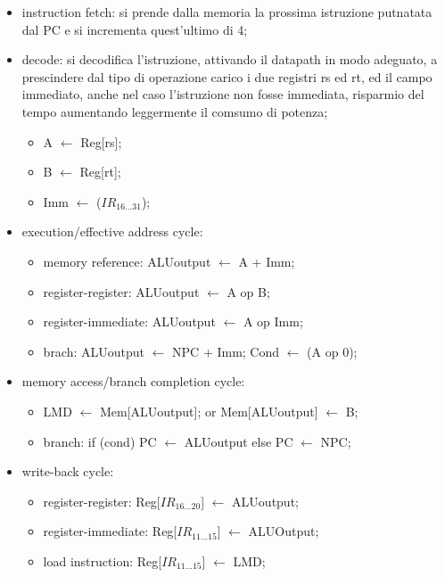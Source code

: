 \documentclass[12pt]{article}
\begin{document}
\begin{itemize}
    \item instruction fetch: si prende dalla memoria la prossima istruzione putnatata dal PC e si incrementa quest'ultimo di 4;
    \item decode: si decodifica l'istruzione, attivando il datapath in modo adeguato, a prescindere dal tipo di operazione carico i due registri rs ed rt, ed il campo immediato, anche nel caso l'istruzione non fosse immediata, risparmio del tempo aumentando leggermente il comsumo di potenza;
    \begin{itemize}
        \item A $\leftarrow$ Reg[rs];
        \item B $\leftarrow$ Reg[rt];
        \item Imm $\leftarrow$ ($IR_{16\dots 31}$);
    \end{itemize}
    \item execution/effective address cycle: 
        \begin{itemize}
            \item memory reference: ALUoutput $\leftarrow$ A + Imm;
            \item register-register: ALUoutput $\leftarrow$ A op B;
            \item register-immediate: ALUoutput $\leftarrow$ A op Imm;
            \item brach: ALUoutput $\leftarrow$ NPC + Imm; Cond $\leftarrow$ (A op 0);
        \end{itemize}
    \item memory access/branch completion cycle:
        \begin{itemize}
            \item LMD $\leftarrow$ Mem[ALUoutput]; or Mem[ALUoutput] $\leftarrow$ B;
            \item branch: if (cond) PC $\leftarrow$ ALUoutput else PC $\leftarrow$ NPC;
        \end{itemize}
    \item write-back cycle:
        \begin{itemize}
            \item register-register: Reg[$IR_{16\dots 20}$] $\leftarrow$ ALUoutput;
            \item register-immediate: Reg[$IR_{11\dots 15}$] $\leftarrow$ ALUOutput;
            \item load instruction: Reg[$IR_{11\dots 15}$] $\leftarrow$ LMD;
        \end{itemize}
\end{itemize}
\end{document}
